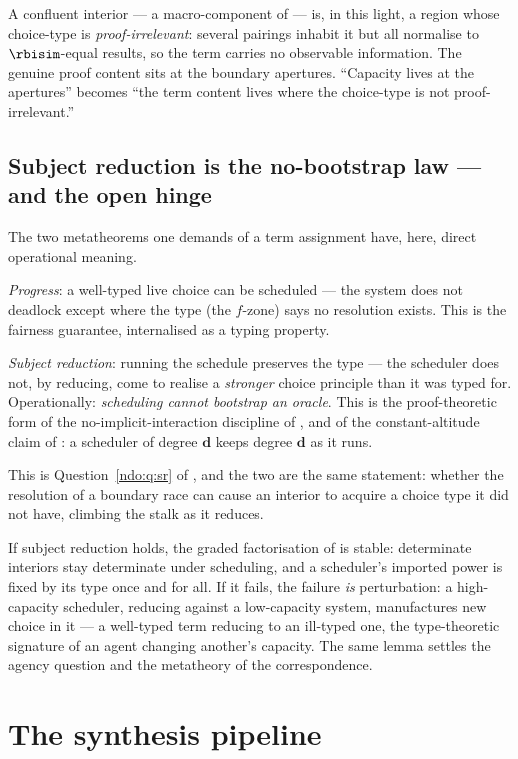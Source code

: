 A confluent interior --- a macro-component of \chApr --- is, in this light, a region whose choice-type
is \emph{proof-irrelevant}: several pairings inhabit it but all normalise to $\rbisim$-equal results, so the
term carries no observable information. The genuine proof content sits at the boundary apertures. ``Capacity
lives at the apertures'' becomes ``the term content lives where the choice-type is not
proof-irrelevant.''

\subsection{Subject reduction is the no-bootstrap law --- and the open hinge}

The two metatheorems one demands of a term assignment have, here, direct operational meaning.

\emph{Progress}: a well-typed live choice can be scheduled --- the system does not deadlock except where the
type (the $f$-zone) says no resolution exists. This is the fairness guarantee, internalised as a typing property.

\emph{Subject reduction}: running the schedule preserves the type --- the scheduler does not, by reducing,
come to realise a \emph{stronger} choice principle than it was typed for. Operationally: \emph{scheduling
cannot bootstrap an oracle}. This is the proof-theoretic form of the no-implicit-interaction discipline of
\cite{paths}, and of the constant-altitude claim of \chAgy: a scheduler of degree $\mathbf d$ keeps
degree $\mathbf d$ as it runs.

This is Question~\ref{ndo:q:sr} of \chAgy, and the two are the same statement:
whether the resolution of a boundary race can cause an interior to acquire a
choice type it did not have, climbing the stalk as it reduces.

\noindent
If subject reduction holds, the graded factorisation of \chAgy is stable: determinate interiors stay determinate
under scheduling, and a scheduler's imported power is fixed by its type once and for all. If it fails, the
failure \emph{is} perturbation: a high-capacity scheduler, reducing against a low-capacity system, manufactures
new choice in it --- a well-typed term reducing to an ill-typed one, the type-theoretic signature of an agent
changing another's capacity. The same lemma settles the agency question and the metatheory of the correspondence.

\section{The synthesis pipeline}\label{chs:sec:pipeline}

